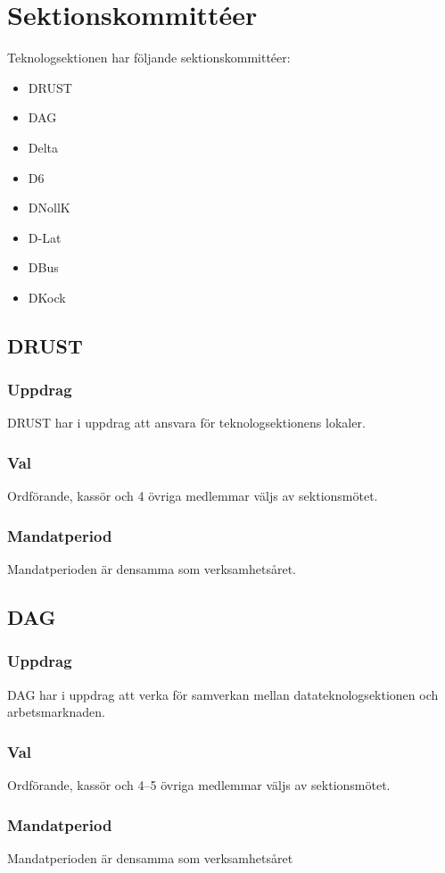 \section{Sektionskommittéer}

Teknologsektionen har följande sektionskommittéer: 
\begin{itemize}
  \item DRUST 
  \item DAG 
  \item Delta 
  \item D6 
  \item DNollK
  \item D-Lat
  \item DBus
  \item DKock
\end{itemize}

\subsection{DRUST} 
\subsubsection{Uppdrag}
DRUST har i uppdrag att ansvara för teknologsektionens lokaler.
\subsubsection{Val}
Ordförande, kassör och 4 övriga medlemmar väljs av sektionsmötet. 
\subsubsection{Mandatperiod}
Mandatperioden är densamma som verksamhetsåret. 

\subsection{DAG}
\subsubsection{Uppdrag} 
DAG har i uppdrag att verka för samverkan mellan datateknologsektionen och arbetsmarknaden. 
\subsubsection{Val}
Ordförande, kassör och 4--5 övriga medlemmar väljs av sektionsmötet.
\subsubsection{Mandatperiod}
Mandatperioden är densamma som verksamhetsåret

